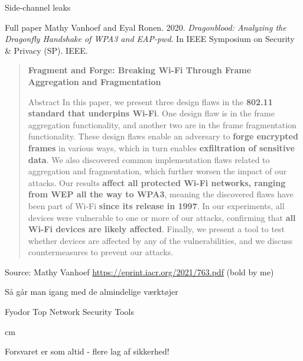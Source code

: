 \documentclass[Screen16to9,17pt]{foils}
\begin{document}
\begin{list2}
\item Side-channel leaks
\item Full paper Mathy Vanhoef and Eyal Ronen. 2020. \emph{Dragonblood: Analyzing the Dragonfly Handshake of WPA3 and EAP-pwd}. In IEEE Symposium on Security \& Privacy (SP). IEEE.

\end{list2}



\begin{quote}\small
{\bf Fragment and Forge: Breaking Wi-Fi Through
Frame Aggregation and Fragmentation}

Abstract
In this paper, we present three design flaws in the {\bf 802.11
standard that underpins Wi-Fi}. One design flaw is in the frame
aggregation functionality, and another two are in the frame
fragmentation functionality. These design flaws enable an
adversary to {\bf forge encrypted frames} in various ways, which in
turn enables {\bf exfiltration of sensitive data}. We also discovered
common implementation flaws related to aggregation and
fragmentation, which further worsen the impact of our attacks.
Our results {\bf affect all protected Wi-Fi networks, ranging from
WEP all the way to WPA3}, meaning the discovered flaws
have been part of Wi-Fi {\bf since its release in 1997}. In our
experiments, all devices were vulnerable to one or more of our
attacks, confirming that {\bf all Wi-Fi devices are likely affected}.
Finally, we present a tool to test whether devices are affected
by any of the vulnerabilities, and we discuss countermeasures
to prevent our attacks.

\end{quote}
Source: Mathy Vanhoef \url{https://eprint.iacr.org/2021/763.pdf} (bold by me)



\begin{list1}
\item Så går man igang med de almindelige værktøjer
\item Fyodor Top Network Security Tools 
\end{list1}
 cm

\centerline{\hlkbig Forsvaret er som altid - flere lag af sikkerhed! }

\end{document}

